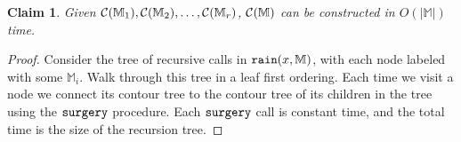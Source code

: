 \documentclass[11pt]{article}
\newcommand{\ignore}[1]{}
\newtheorem{claim}[theorem]{Claim}
\newtheorem{corollary}[theorem]{Corollary}
\theoremstyle{definition}
\newcommand{\cC}{{\cal C}}
\newcommand{\MM}{\mathbb{M}}
\newcommand{\NN}{\mathbb{N}}
\newcommand{\Lem}[1]{\hyperref[lem:#1]{Lemma~\ref*{lem:#1}}} %
\newcommand{\rain}{{\tt rain}}
\newcommand{\reeb}{\cC}
\newcommand{\surgery}{{\tt surgery}}
\newcommand{\wet}{{\tt wet}}
\begin{document}
\ignore{
As each original vertex in $\NN$ appears in only one of the sub-manifolds output by $\rain(x,\NN)$, we have the following corollary.

\begin{corollary}
The total size of a sub-manifolds output by $\rain(x,\MM)$ is $O(n)$.
\end{corollary}

\begin{corollary} \label{cor:rain-time} The total running time of $\rain(x,\MM)$ is $O(n)$.
\end{corollary}

\begin{proof} Consider some invocation to $\rain(x,\MM)$. The only non-trivial work done in $\rain$ is by the calls to $\wet$.
We know that each invocation to $\wet$ runs in time linear 
to the portion of the manifold which is wet (including the new boundary vertices created).  
As the output of $\rain$ is precisely the distinct sub-manifolds wet by each distinct call to $\wet$, the claim follows.
\end{proof}
 
}



\begin{claim} \label{clm:rain-reeb} Given $\reeb(\MM_1), \reeb(\MM_2), \ldots, \reeb(\MM_r)$, 
$\reeb(\MM)$ can be constructed in $O(|\MM|)$ time.
\end{claim}

\begin{proof} Consider the tree of recursive calls in $\rain(x,\MM)$, with each node
labeled with some $\MM_i$.
%
Walk through this tree in a leaf first ordering.  Each time we visit a node we connect its contour tree to the 
contour tree of its children in the tree using the $\surgery$ procedure. 
Each $\surgery$ call is constant time, and the total time is the size of the recursion tree.
%
%
\end{proof}
\end{document}
